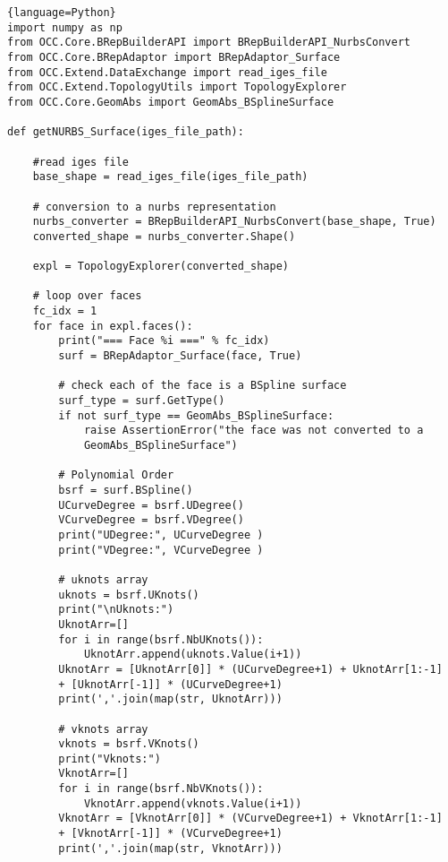 \lstset{style=python2}
\begin{adjustwidth}{-0.5cm}{-0.5cm}

\begin{lstlisting}{language=Python}
import numpy as np
from OCC.Core.BRepBuilderAPI import BRepBuilderAPI_NurbsConvert
from OCC.Core.BRepAdaptor import BRepAdaptor_Surface
from OCC.Extend.DataExchange import read_iges_file
from OCC.Extend.TopologyUtils import TopologyExplorer
from OCC.Core.GeomAbs import GeomAbs_BSplineSurface

def getNURBS_Surface(iges_file_path):
    
    #read iges file
    base_shape = read_iges_file(iges_file_path)
    
    # conversion to a nurbs representation
    nurbs_converter = BRepBuilderAPI_NurbsConvert(base_shape, True)
    converted_shape = nurbs_converter.Shape()
    
    expl = TopologyExplorer(converted_shape)
    
    # loop over faces
    fc_idx = 1
    for face in expl.faces():
        print("=== Face %i ===" % fc_idx)
        surf = BRepAdaptor_Surface(face, True)
        
        # check each of the face is a BSpline surface
        surf_type = surf.GetType()
        if not surf_type == GeomAbs_BSplineSurface:
            raise AssertionError("the face was not converted to a 
            GeomAbs_BSplineSurface")
        
        # Polynomial Order
        bsrf = surf.BSpline()
        UCurveDegree = bsrf.UDegree()
        VCurveDegree = bsrf.VDegree()
        print("UDegree:", UCurveDegree )
        print("VDegree:", VCurveDegree )
        
        # uknots array
        uknots = bsrf.UKnots()
        print("\nUknots:")
        UknotArr=[]
        for i in range(bsrf.NbUKnots()):
            UknotArr.append(uknots.Value(i+1))
        UknotArr = [UknotArr[0]] * (UCurveDegree+1) + UknotArr[1:-1] 
        + [UknotArr[-1]] * (UCurveDegree+1)
        print(','.join(map(str, UknotArr)))
        
        # vknots array
        vknots = bsrf.VKnots()
        print("Vknots:")
        VknotArr=[]
        for i in range(bsrf.NbVKnots()):
            VknotArr.append(vknots.Value(i+1))
        VknotArr = [VknotArr[0]] * (VCurveDegree+1) + VknotArr[1:-1] 
        + [VknotArr[-1]] * (VCurveDegree+1)
        print(','.join(map(str, VknotArr)))


\end{lstlisting}
\end{adjustwidth}
